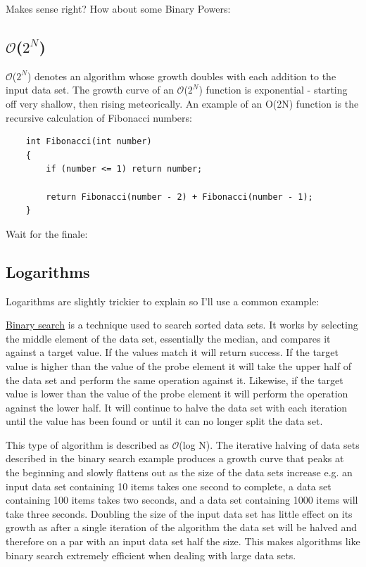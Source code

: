 \documentclass[12pt]{article}
\begin{document}
Makes sense right? How about some Binary Powers:

\subsection{$\mathcal{O}$($2^N$)}
$\mathcal{O}$($2^N$) denotes an algorithm whose growth doubles with each addition to the input data set. The growth curve of an $\mathcal{O}$($2^N$) function is exponential - starting off very shallow, then rising meteorically. An example of an O(2N) function is the recursive calculation of Fibonacci numbers:

\begin{verbatim}
    int Fibonacci(int number)
    {
        if (number <= 1) return number;

        return Fibonacci(number - 2) + Fibonacci(number - 1);
    }
\end{verbatim}

Wait for the finale:

\subsection{Logarithms}
Logarithms are slightly trickier to explain so I'll use a common example:

\href{https://en.wikipedia.org/wiki/Binary_search_algorithm#Derivation_of_average_case}{Binary search} is a technique used to search sorted data sets. It works by selecting the middle element of the data set, essentially the median, and compares it against a target value. If the values match it will return success. If the target value is higher than the value of the probe element it will take the upper half of the data set and perform the same operation against it. Likewise, if the target value is lower than the value of the probe element it will perform the operation against the lower half. It will continue to halve the data set with each iteration until the value has been found or until it can no longer split the data set.

This type of algorithm is described as $\mathcal{O}$(log N). The iterative halving of data sets described in the binary search example produces a growth curve that peaks at the beginning and slowly flattens out as the size of the data sets increase e.g. an input data set containing 10 items takes one second to complete, a data set containing 100 items takes two seconds, and a data set containing 1000 items will take three seconds. Doubling the size of the input data set has little effect on its growth as after a single iteration of the algorithm the data set will be halved and therefore on a par with an input data set half the size. This makes algorithms like binary search extremely efficient when dealing with large data sets.
\end{document}
